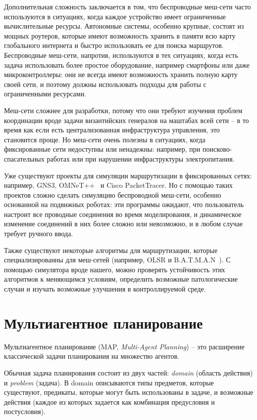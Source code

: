 \documentclass[%
]{report}
\begin{document}
Дополнительная сложность заключается в том, что
беспроводные меш-сети часто используются в ситуациях,
когда каждое устройство имеет ограниченные вычислительные ресурсы.
Автономные системы, особенно крупные,
состоят из мощных роутеров,
которые имеют возможность хранить в памяти всю карту глобального интернета
и быстро использовать ее для поиска маршрутов.
Беспроводные меш-сети, напротив, используются в тех ситуациях,
когда есть задача использовать более простое оборудование,
например смартфоны или даже микроконтроллеры:
они не всегда имеют возможность хранить полную карту своей сети,
и поэтому должны использовать подходы для работы с ограниченными ресурсами.

Меш-сети сложнее для разработки, потому что они требуют
изучения проблем координации вроде задачи византийских генералов на маштабах всей сети --
в то время как если есть централизованная инфраструктура управления, это становится проще.
Но меш-сети очень полезны в ситуациях, когда фиксированные сети недоступны или ненадежны:
например, при поисково-спасательных работах или при нарушении инфраструктуры электропитания.

Уже существуют проекты для симуляции маршрутизации в фиксированных сетях:
например, GNS3, OMNeT++~\cite{9181563} и Cisco PacketTracer.
Но с помощью таких проектов сложно сделать симуляцию беспроводной меш-сети,
особенно основанной на подвижных роботах:
эти программы ожидают, что пользователь настроит все проводные соединения
во время моделирования,
и динамическое изменение соединений в них более сложно или невозможно,
и в любом случае требует ручного ввода.

Также существуют некоторые алгоритмы для маршрутизации,
которые специализированны для меш-сетей
(например, OLSR и B.A.T.M.A.N~\cite{DBLP:journals/corr/abs-1901-02298}).
С помощью симулятора вроде нашего, можно проверять устойчивость этих алгоритмов к меняющимся условиям,
определить возможные патологические случаи
и изучать возможные улучшения
в контроллируемой среде.

\section{Мультиагентное планирование}

Мультиагентное планирование (MAP, \emph{Multi-Agent Planning}) --
это расширение классической задачи планирования
на множество агентов.

Обычная задача планирования состоит из двух частей:
\emph{domain} (область действия) и \emph{problem} (задача).
В domain описываются типы предметов, которые существуют,
предикаты, которые могут быть использованы в задаче,
и возможные действия (каждое из которых задается как комбинация предусловия и постусловия).
\end{document}
